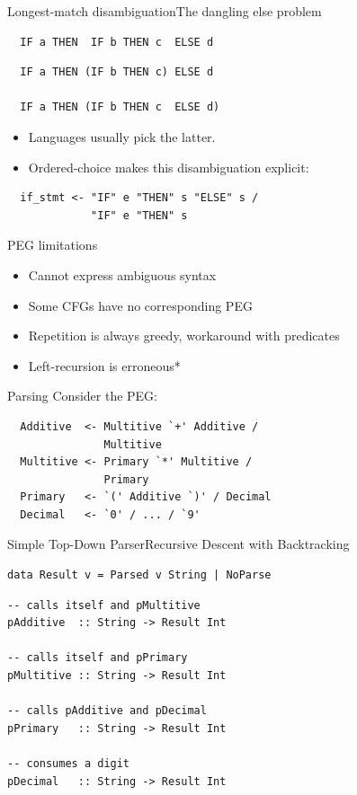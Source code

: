 \documentclass{beamer}
\begin{document}
\begin{frame}[fragile]{Longest-match disambiguation}{The dangling else
    problem}
\begin{verbatim}
  IF a THEN  IF b THEN c  ELSE d
\end{verbatim}
\pause
\begin{verbatim}
  IF a THEN (IF b THEN c) ELSE d

  IF a THEN (IF b THEN c  ELSE d)
\end{verbatim}
\pause
\begin{itemize}
  \item Languages usually pick the latter.
  \item Ordered-choice makes this disambiguation explicit:
\end{itemize}
\begin{verbatim}
  if_stmt <- "IF" e "THEN" s "ELSE" s / 
             "IF" e "THEN" s
\end{verbatim}
\end{frame}

\begin{frame}{PEG limitations}
  \begin{itemize}
    \item Cannot express ambiguous syntax
    \item Some CFGs have no corresponding PEG
    \item Repetition is always greedy, workaround with predicates
    \item Left-recursion is erroneous*
  \end{itemize}
\end{frame}

\begin{frame}[fragile]{Parsing}
Consider the PEG:
\begin{verbatim}
  Additive  <- Multitive `+' Additive / 
               Multitive
  Multitive <- Primary `*' Multitive / 
               Primary
  Primary   <- `(' Additive `)' / Decimal
  Decimal   <- `0' / ... / `9' 
\end{verbatim}
\end{frame}

\begin{frame}[fragile]{Simple Top-Down Parser}{Recursive Descent with Backtracking}
\begin{verbatim}
data Result v = Parsed v String | NoParse
\end{verbatim}
\pause
\begin{verbatim}
-- calls itself and pMultitive
pAdditive  :: String -> Result Int 

-- calls itself and pPrimary
pMultitive :: String -> Result Int 

-- calls pAdditive and pDecimal
pPrimary   :: String -> Result Int 

-- consumes a digit
pDecimal   :: String -> Result Int
\end{verbatim}
\end{frame}
\end{document}

